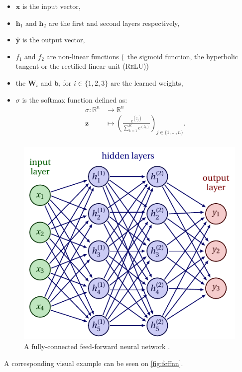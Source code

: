 \begin{itemize}[nolistsep]
    \item $\mathbf{x}$ is the input vector,
    \item $\mathbf{h}_1$ and $\mathbf{h}_2$ are the first and second layers respectively,
    \item $\hat{\mathbf{y}}$ is the output vector,
    \item $f_1$ and $f_2$ are non-linear functions (\eg\ the sigmoid function, the hyperbolic tangent or the rectified linear unit (\textsc{ReLU}))
    \item the $\mathbf{W}_i$ and $\mathbf{b}_i$ for $i \in \{1,2,3\}$ are the learned weights,
    \item $\sigma$ is the softmax function defined as:
        \begin{align*}
        \sigma \colon \mathbb{R}^n & \rightarrow \mathbb{R}^n \\
        \mathbf{z} & \mapsto \left( \frac{e^{(z_j)}}{\sum_{k=1}^K e^{(z_k)}} \right)_{j \in \{1, \dots, n\}} . \\
        \end{align*}
\end{itemize}

\begin{figure}[h!]
    \centering
    \includegraphics[width=0.55\columnwidth]{chapter2/pictures/neural_network.pdf}
    \caption{A fully-connected feed-forward neural network \citep{neutelingsNeuralNetworks2021}.}
    \label{fig:fcffnn}
\end{figure}

A corresponding visual example can be seen on \autoref{fig:fcffnn}.

